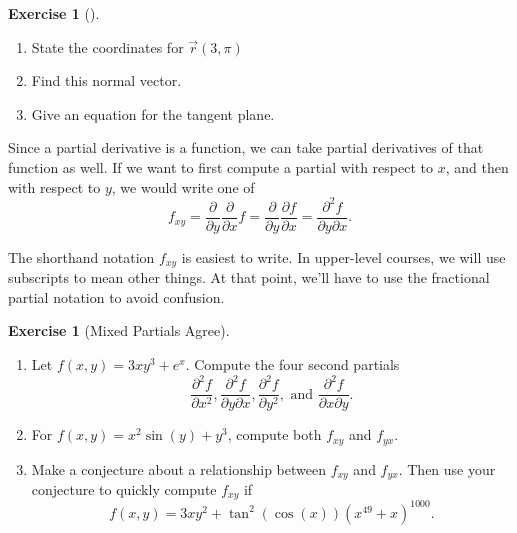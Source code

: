 \documentclass[10pt,]{book}
\theoremstyle{plain}
\theoremstyle{definition}
\theoremstyle{definition}
\theoremstyle{definition}
\theoremstyle{definition}
\newtheorem{exploration}[project]{Exercise}
\theoremstyle{definition}
\numberwithin{equation}{section}
\newcommand{\ds}{\displaystyle}
\begin{document}
\begin{exploration}[]\label{exploration-141}
\leavevmode%
\begin{enumerate}[font=\bfseries,label=(\alph*),ref=\alph*]
\item\label{task-306} State the coordinates for \(\vec r (3,\pi)\)%
\item\label{task-307} Find this normal vector.%
\item\label{task-308} Give an equation for the tangent plane.%
\end{enumerate}
\end{exploration}
Since a partial derivative is a function, we can take partial derivatives of that function as well. If we want to first compute a partial with respect to \(x\), and then with respect to \(y\), we would write one of%
\begin{equation*}
f_{xy}=\ds\frac{\partial}{\partial y}\frac{\partial}{\partial x}f = \frac{\partial}{\partial y}\frac{\partial f}{\partial x} = \frac{\partial^2 f}{\partial y \partial x}.
\end{equation*}
%
\par
The shorthand notation \(f_{xy}\) is easiest to write. In upper-level courses, we will use subscripts to mean other things. At that point, we'll have to use the fractional partial notation to avoid confusion.%
\begin{exploration}[Mixed Partials Agree]\label{prob_second_partials_agree}
\leavevmode%
\begin{enumerate}[font=\bfseries,label=(\alph*),ref=\alph*]
\item\label{task-309} Let \(f(x,y)=3xy^3+e^{x}.\) Compute the four second partials%
\begin{equation*}
\ds \frac{\partial^2 f}{ \partial x^2}, \ds\frac{\partial^2 f}{\partial y \partial x}, \ds\frac{\partial^2 f}{\partial y^2},  \text{ and } \ds\frac{\partial^2 f}{\partial x \partial y}.
\end{equation*}
%
\item\label{task-310} For \(f(x,y)=x^2\sin(y)+y^3\), compute both \(f_{xy}\) and \(f_{yx}\).%
\item\label{task-311} Make a conjecture about a relationship between \(f_{xy}\) and \(f_{yx}\). Then use your conjecture to quickly compute \(f_{xy}\) if%
\begin{equation*}
f(x,y)=3xy^2+\tan^{2}(\cos(x)) (x^{49}+x)^{1000}.
\end{equation*}
%
\end{enumerate}
\end{exploration}
\typeout{************************************************}
\typeout{************************************************}
\end{document}
